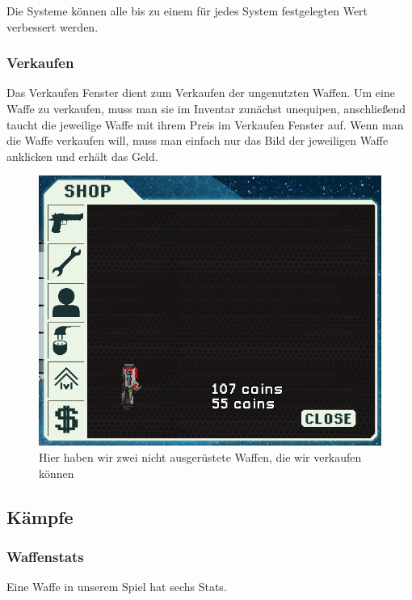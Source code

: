 \documentclass[fontsize=12pt,paper=a4,twoside]{scrartcl}
\begin{document}
Die Systeme können alle bis zu einem für jedes System festgelegten Wert verbessert werden. 

\subsubsection{Verkaufen}

Das Verkaufen Fenster dient zum Verkaufen der ungenutzten Waffen. Um eine Waffe zu verkaufen, muss man sie im Inventar zunächst unequipen, anschließend taucht die jeweilige Waffe mit ihrem Preis im Verkaufen Fenster auf. Wenn man die Waffe verkaufen will, muss man einfach nur das Bild der jeweiligen Waffe anklicken und erhält das Geld. 

\begin{figure}[H]
\centering
\includegraphics[width=1\linewidth]{DasSpiel/Shop/sell.png}
\caption{Hier haben wir zwei nicht ausgerüstete Waffen, die wir verkaufen können}
\end{figure}




\subsection{Kämpfe}

\subsubsection{Waffenstats}

Eine Waffe in unserem Spiel hat sechs Stats. 
\end{document}
